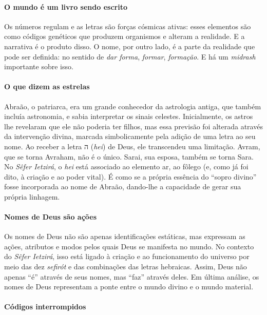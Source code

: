 \paragraph{O mundo é um livro sendo escrito} Os números regulam e as letras são forças cósmicas ativas: esses elementos são como códigos genéticos que produzem organismos e alteram a realidade. E a narrativa é o produto disso. O nome, por outro lado, é a parte da realidade que pode ser definida: no sentido de \textit{dar forma}, \textit{formar}, \textit{formação}. E há um \textit{midrash} importante sobre isso.

\paragraph{O que dizem as estrelas} Abraão, o patriarca, era um grande conhecedor da astrologia antiga, que também incluía astronomia, e sabia interpretar os sinais celestes. Inicialmente, os astros lhe revelaram que ele não poderia ter filhos, mas essa previsão foi alterada através da intervenção divina, marcada simbolicamente pela adição de uma letra ao seu nome. Ao receber a letra {\frank ה} (\textit{hei}) de Deus, ele transcendeu uma limitação. Avram, que se torna Avraham, não é o único. Sarai, sua esposa, também se torna Sara. No \textit{Sêfer Ietzirá}, o \textit{hei} está associado ao elemento ar, ao fôlego (e, como já foi dito, à criação e ao poder vital). É como se a própria essência do ``sopro divino'' fosse incorporada ao nome de Abraão, dando-lhe a capacidade de gerar sua própria linhagem.

\paragraph{Nomes de Deus são ações} Os nomes de Deus não são apenas identificações estáticas, mas expressam as ações, atributos e modos pelos quais Deus se manifesta no mundo. No contexto do \textit{Sêfer Ietzirá}, isso está ligado à criação e ao funcionamento do universo por meio das dez \textit{sefirót} e das combinações das letras hebraicas. Assim, Deus não apenas ``é'' através de seus nomes, mas ``faz'' através deles. Em última análise, os nomes de Deus representam a ponte entre o mundo divino e o mundo material.  

\paragraph{Códigos interrompidos} 